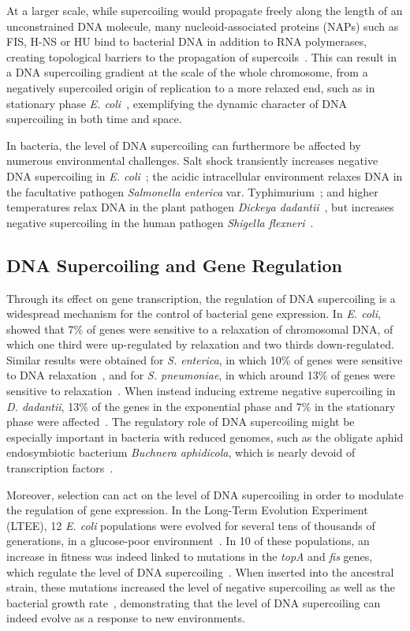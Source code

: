 At a larger scale, while supercoiling would propagate freely along the length of an unconstrained DNA molecule, many nucleoid-associated proteins (NAPs) such as FIS, H-NS or HU bind to bacterial DNA in addition to RNA polymerases, creating topological barriers to the propagation of supercoils~\citep{travers2005a}.
This can result in a DNA supercoiling gradient at the scale of the whole chromosome, from a negatively supercoiled origin of replication to a more relaxed end, such as in stationary phase \emph{E. coli}~\citep{lal2016}, exemplifying the dynamic character of DNA supercoiling in both time and space.

In bacteria, the level of DNA supercoiling can furthermore be affected by numerous environmental challenges.
Salt shock transiently increases negative DNA supercoiling in \emph{E. coli}~\citep{hsieh1991}; the acidic intracellular environment relaxes DNA in the facultative pathogen \emph{Salmonella enterica} var. Typhimurium~\citep{marshall2000}; and higher temperatures relax DNA in the plant pathogen \emph{Dickeya dadantii}~\citep{herault2014}, but increases negative supercoiling in the human pathogen \emph{Shigella flexneri}~\citep{tobe1995}.

\subsection{DNA Supercoiling and Gene Regulation}

Through its effect on gene transcription, the regulation of DNA supercoiling is a widespread mechanism for the control of bacterial gene expression.
In \emph{E. coli},~\cite{peter2004} showed that 7\% of genes were sensitive to a relaxation of chromosomal DNA, of which one third were up-regulated by relaxation and two thirds down-regulated.
Similar results were obtained for \emph{S. enterica}, in which 10\% of genes were sensitive to DNA relaxation~\citep{webber2013}, and for \emph{S. pneumoniae}, in which around 13\% of genes were sensitive to relaxation~\citep{ferrandiz2010}.
When instead inducing extreme negative supercoiling in \emph{D. dadantii}, 13\% of the genes in the exponential phase and 7\% in the stationary phase were affected~\citep{pineau2022}.
The regulatory role of DNA supercoiling might be especially important in bacteria with reduced genomes, such as the obligate aphid endosymbiotic bacterium \emph{Buchnera aphidicola}, which is nearly devoid of transcription factors~\citep{brinza2013}.

Moreover, selection can act on the level of DNA supercoiling in order to modulate the regulation of gene expression.
In the Long-Term Evolution Experiment (LTEE), 12 \emph{E. coli} populations were evolved for several tens of thousands of generations, in a glucose-poor environment~\citep{lenski1991}.
In 10 of these populations, an increase in fitness was indeed linked to mutations in the \emph{topA} and \emph{fis} genes, which regulate the level of DNA supercoiling~\citep{crozat2010}.
When inserted into the ancestral strain, these mutations increased the level of negative supercoiling as well as the bacterial growth rate~\citep{crozat2005}, demonstrating that the level of DNA supercoiling can indeed evolve as a response to new environments.


